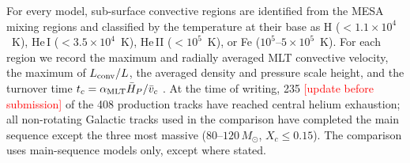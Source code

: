 \documentclass[twocolumn]{aastex631}
\newcommand{\todo}[1]{\textcolor{red}{[#1]}}
\begin{document}
For every model, sub-surface convective regions are identified from the MESA mixing regions and classified by the temperature at their base as H ($<1.1\times10^4$~K), He\,I ($<3.5\times10^4$~K), He\,II ($<10^5$~K), or Fe ($10^5$--$5\times10^5$~K). For each region we record the maximum and radially averaged MLT convective velocity, the maximum of $L_{\rm conv}/L$, the averaged density and pressure scale height, and the turnover time $t_c=\alpha_{\rm MLT}\bar H_P/\bar v_c$ \citep{cantiello2021}. At the time of writing, 235 \todo{update before submission} of the 408 production tracks have reached central helium exhaustion; all non-rotating Galactic tracks used in the comparison have completed the main sequence except the three most massive (80--$120\,M_\odot$, $X_c\le0.15$). The comparison uses main-sequence models only, except where stated.










\end{document}

